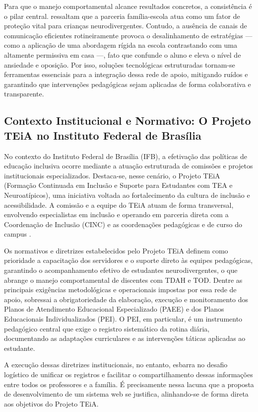Para que o manejo comportamental alcance resultados concretos, a consistência é o pilar central.  ressaltam que a parceria família-escola atua como um fator de proteção vital para crianças neurodivergentes. Contudo, a ausência de canais de comunicação eficientes rotineiramente provoca o desalinhamento de estratégias --- como a aplicação de uma abordagem rígida na escola contrastando com uma altamente permissiva em casa ---, fato que confunde o aluno e eleva o nível de ansiedade e oposição. Por isso, soluções tecnológicas estruturadas tornam-se ferramentas essenciais para a integração dessa rede de apoio, mitigando ruídos e garantindo que intervenções pedagógicas sejam aplicadas de forma colaborativa e transparente.

\subsection{Contexto Institucional e Normativo: O Projeto TEiA no Instituto Federal de Brasília}

No contexto do Instituto Federal de Brasília (IFB), a efetivação das políticas de educação inclusiva ocorre mediante a atuação estruturada de comissões e projetos institucionais especializados. Destaca-se, nesse cenário, o Projeto TEiA (Formação Continuada em Inclusão e Suporte para Estudantes com TEA e Neuroatípicos), uma iniciativa voltada ao fortalecimento da cultura de inclusão e acessibilidade. A comissão e a equipe do TEiA atuam de forma transversal, envolvendo especialistas em inclusão e operando em parceria direta com a Coordenação de Inclusão (CINC) e as coordenações pedagógicas e de curso do campus \cite{brasil2025ted}.

Os normativos e diretrizes estabelecidos pelo Projeto TEiA definem como prioridade a capacitação dos servidores e o suporte direto às equipes pedagógicas, garantindo o acompanhamento efetivo de estudantes neurodivergentes, o que abrange o manejo comportamental de discentes com TDAH e TOD. Dentre as principais exigências metodológicas e operacionais impostas por essa rede de apoio, sobressai a obrigatoriedade da elaboração, execução e monitoramento dos Planos de Atendimento Educacional Especializado (PAEE) e dos Planos Educacionais Individualizados (PEI). O PEI, em particular, é um instrumento pedagógico central que exige o registro sistemático da rotina diária, documentando as adaptações curriculares e as intervenções táticas aplicadas ao estudante.

A execução dessas diretrizes institucionais, no entanto, esbarra no desafio logístico de unificar os registros e facilitar o compartilhamento dessas informações entre todos os professores e a família. É precisamente nessa lacuna que a proposta de desenvolvimento de um sistema web se justifica, alinhando-se de forma direta aos objetivos do Projeto TEiA.


